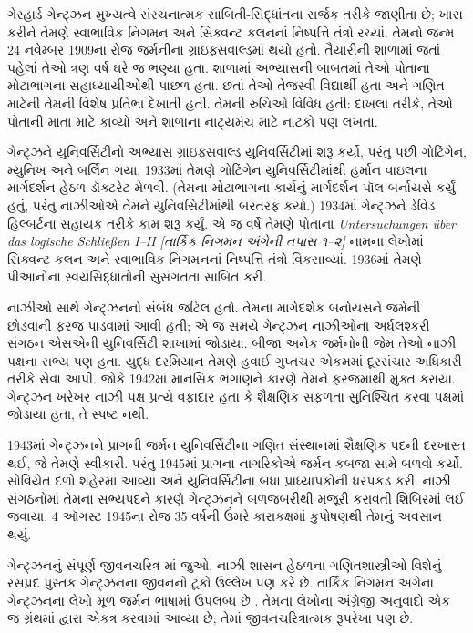 
\label{guunit:OLP-0624}



ગેરહાર્ડ ગેન્ટ્ઝન મુખ્યત્વે સંરચનાત્મક સાબિતી-સિદ્ધાંતના
સર્જક તરીકે જાણીતા છે; ખાસ કરીને તેમણે સ્વાભાવિક નિગમન
અને સિક્વન્ટ કલનનાં નિષ્પત્તિ તંત્રો રચ્યાં.
તેમનો જન્મ 24 નવેમ્બર 1909ના રોજ જર્મનીના
ગ્રાઇફ્સવાલ્ડમાં થયો હતો. તૈયારીની શાળામાં જતાં પહેલાં
તેઓ ત્રણ વર્ષ ઘરે જ ભણ્યા હતા. શાળામાં અભ્યાસની બાબતમાં
તેઓ પોતાના મોટાભાગના સહાધ્યાયીઓથી પાછળ હતા.
છતાં તેઓ તેજસ્વી વિદ્યાર્થી હતા અને ગણિત માટેની
તેમની વિશેષ પ્રતિભા દેખાતી હતી. તેમની રુચિઓ વિવિધ
હતી: દાખલા તરીકે, તેઓ પોતાની માતા માટે કાવ્યો
અને શાળાના નાટ્યમંચ માટે નાટકો પણ લખતા.

ગેન્ટ્ઝને યુનિવર્સિટીનો અભ્યાસ ગ્રાઇફ્સવાલ્ડ
યુનિવર્સિટીમાં શરૂ કર્યો, પરંતુ પછી ગોટિંગેન,
મ્યુનિખ અને બર્લિન ગયા. 1933માં તેમણે ગોટિંગેન
યુનિવર્સિટીમાંથી હર્માન વાઇલના માર્ગદર્શન હેઠળ
ડૉક્ટરેટ મેળવી. (તેમના મોટાભાગના કાર્યનું
માર્ગદર્શન પૉલ બર્નાયસે કર્યું હતું, પરંતુ
નાઝીઓએ તેમને યુનિવર્સિટીમાંથી બરતરફ કર્યા.)
1934માં ગેન્ટ્ઝને ડેવિડ હિલ્બર્ટના સહાયક તરીકે
કામ શરૂ કર્યું. એ જ વર્ષે તેમણે પોતાના
\emph{Untersuchungen \"{u}ber das logische Schlie\ss en I--II
  [તાર્કિક નિગમન અંગેની તપાસ ૧--૨]} નામના
લેખોમાં સિક્વન્ટ કલન અને સ્વાભાવિક નિગમનનાં
નિષ્પત્તિ તંત્રો વિકસાવ્યાં. 1936માં
તેમણે પીઆનોના સ્વયંસિદ્ધાંતોની સુસંગતતા સાબિત કરી.

નાઝીઓ સાથે ગેન્ટ્ઝનનો સંબંધ જટિલ હતો.
તેમના માર્ગદર્શક બર્નાયસને જર્મની છોડવાની
ફરજ પાડવામાં આવી હતી; એ જ સમયે ગેન્ટ્ઝન
નાઝીઓના અર્ધલશ્કરી સંગઠન એસએની યુનિવર્સિટી
શાખામાં જોડાયા. બીજા અનેક જર્મનોની જેમ
તેઓ નાઝી પક્ષના સભ્ય પણ હતા. યુદ્ધ દરમિયાન
તેમણે હવાઈ ગુપ્તચર એકમમાં દૂરસંચાર અધિકારી
તરીકે સેવા આપી. જોકે 1942માં માનસિક ભંગાણને
કારણે તેમને ફરજમાંથી મુક્ત કરાયા. ગેન્ટ્ઝન
ખરેખર નાઝી પક્ષ પ્રત્યે વફાદાર હતા કે
શૈક્ષણિક સફળતા સુનિશ્ચિત કરવા પક્ષમાં
જોડાયા હતા, તે સ્પષ્ટ નથી.

1943માં ગેન્ટ્ઝનને પ્રાગની જર્મન યુનિવર્સિટીના
ગણિત સંસ્થાનમાં શૈક્ષણિક પદની દરખાસ્ત થઈ,
જે તેમણે સ્વીકારી. પરંતુ 1945માં પ્રાગના
નાગરિકોએ જર્મન કબજા સામે બળવો કર્યો.
સોવિયેત દળો શહેરમાં આવ્યાં અને યુનિવર્સિટીના
બધા પ્રાધ્યાપકોની ધરપકડ કરી. નાઝી
સંગઠનોમાં તેમના સભ્યપદને કારણે ગેન્ટ્ઝનને
બળજબરીથી મજૂરી કરાવતી શિબિરમાં લઈ જવાયા.
4 ઑગસ્ટ 1945ના રોજ 35 વર્ષની ઉંમરે
કારાકક્ષમાં કુપોષણથી તેમનું અવસાન થયું.

\begin{reading}
ગેન્ટ્ઝનનું સંપૂર્ણ જીવનચરિત્ર \citet{Menzler-Trott2007}માં
જુઓ. નાઝી શાસન હેઠળના ગણિતશાસ્ત્રીઓ વિશેનું
રસપ્રદ પુસ્તક \citet{Segal2014} ગેન્ટ્ઝનના
જીવનનો ટૂંકો ઉલ્લેખ પણ કરે છે.
તાર્કિક નિગમન અંગેના ગેન્ટ્ઝનના લેખો મૂળ
જર્મન ભાષામાં ઉપલબ્ધ છે
\citep{Gentzen1935a,Gentzen1935b}. તેમના લેખોના
અંગ્રેજી અનુવાદો એક જ ગ્રંથમાં
\citet{Gentzen1969} દ્વારા એકત્ર કરવામાં આવ્યા છે;
તેમાં જીવનચરિત્રાત્મક રૂપરેખા પણ છે.
\end{reading}
\endgroup


